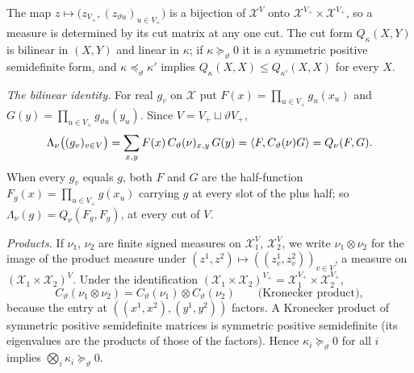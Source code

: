 The map $z\mapsto\big(z_{V_+},(z_{\vartheta u})_{u\in V_+}\big)$ is a bijection
of $\mathcal X^V$ onto $\mathcal X^{V_+}\times\mathcal X^{V_+}$, so a measure is
determined by its cut matrix at any one cut. The cut form $Q_\kappa(X,Y)$ is
bilinear in $(X,Y)$ and linear in $\kappa$; if $\kappa\succeq_\vartheta0$ it is
a symmetric positive semidefinite form, and $\kappa\preceq_\vartheta\kappa'$
implies $Q_\kappa(X,X)\le Q_{\kappa'}(X,X)$ for every $X$.

\emph{The bilinear identity.} For real $g_v$ on $\mathcal X$ put
$F(x)=\prod_{u\in V_+}g_u(x_u)$ and $G(y)=\prod_{u\in V_+}g_{\vartheta u}(y_u)$.
Since $V=V_+\sqcup\vartheta V_+$,
\begin{equation}\label{eq:cc:bilinear}
 \Lambda_\nu\big((g_v)_{v\in V}\big)=\sum_{x,y}F(x)\,C_\vartheta(\nu)_{x,y}\,G(y)
 =\left\langle F,C_\vartheta(\nu)G\right\rangle=Q_\nu(F,G).
\end{equation}
When every $g_v$ equals $g$, both $F$ and $G$ are the half-function
$F_g(x)=\prod_{u\in V_+}g(x_u)$ carrying $g$ at every slot of the plus half; so
$\Lambda_\nu(g)=Q_\nu(F_g,F_g)$, at every cut of $V$.

\emph{Products.} If $\nu_1$, $\nu_2$ are finite signed measures on
$\mathcal X_1^V$, $\mathcal X_2^V$, we write $\nu_1\otimes\nu_2$ for the image of
the product measure under $(z^1,z^2)\mapsto((z^1_v,z^2_v))_{v\in V}$, a measure
on $(\mathcal X_1\times\mathcal X_2)^V$. Under the
identification $(\mathcal X_1\times\mathcal X_2)^{V_+}=\mathcal X_1^{V_+}\times
\mathcal X_2^{V_+}$,
\begin{equation}\label{eq:cc:kron}
 C_\vartheta(\nu_1\otimes\nu_2)=C_\vartheta(\nu_1)\otimes C_\vartheta(\nu_2)
 \qquad\text{(Kronecker product)},
\end{equation}
because the entry at $((x^1,x^2),(y^1,y^2))$ factors. A Kronecker product of
symmetric positive semidefinite matrices is symmetric positive semidefinite
(its eigenvalues are the products of those of the factors). Hence
$\kappa_i\succeq_\vartheta0$ for all $i$ implies
$\bigotimes_i\kappa_i\succeq_\vartheta0$.

